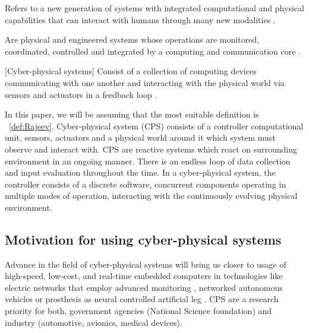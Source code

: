 \documentclass[english,technical,10pt]{FITreport}[2018/01/26]
\begin{document}
\begin{definition}
    Refers to a new generation of systems with integrated computational and physical capabilities that can interact with humans through many new modalities \cite{Baheti:2011}.

\end{definition}

\begin{definition}
    Are physical and engineered systems whose operations are monitored, coordinated, controlled and integrated by a computing and communication core \cite{Rajkumar:2010}.

\end{definition}

\begin{definition}\label{def:Rajeev}[Cyber-physical systems]
    Consist of a collection of computing devices communicating with one another and interacting with the physical world via sensors and actuators in a feedback loop \cite{Alur:2015:PCS:2774947}.
\end{definition}

In this paper, we will be assuming that the most suitable definition is ~\ref{def:Rajeev}. Cyber-physical system (CPS) consists of a controller computational unit, sensors, actuators and a physical world around it which system must observe and interact with. CPS are reactive systems which react on surrounding environment in an ongoing manner. There is an endless loop of data collection and input evaluation throughout the time. In a cyber-physical system, the controller consists of a discrete software, concurrent components operating in multiple modes of operation, interacting with the continuously evolving physical environment.

\subsection{Motivation for using cyber-physical systems}

Advance in the field of cyber-physical systems will bring us closer to usage of high-speed, low-cost, and real-time embedded computers in technologies like electric networks that employ advanced monitoring \cite{Xue:2016}, networked autonomous vehicles \cite{Lee:2008} or prosthesis as neural controlled artificial leg \cite{Zhang:2012}. CPS are a research priority for both, government agencies (National Science foundation) \cite{NSF:CPS:2017} and industry (automotive, avionics, medical devices).
\end{document}
